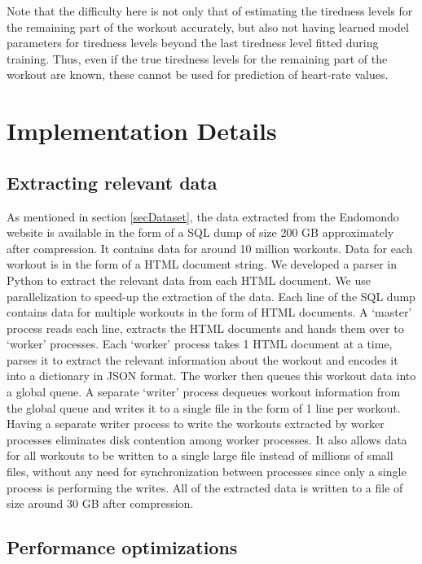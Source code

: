 \documentclass{acm_proc_article-sp}
\begin{document}
Note that the difficulty here is not only that of estimating the tiredness levels for the remaining part of the workout accurately, but also not having learned model parameters for tiredness levels beyond the last tiredness level fitted during training. Thus, even if the true tiredness levels for the remaining part of the workout are known, these cannot be used for prediction of heart-rate values.

\section{Implementation Details}
\label{secImplementationDetails}

\subsection{Extracting relevant data}
As mentioned in section \ref{secDataset}, the data extracted from the Endomondo website \cite{endomondo} is available in the form of a SQL dump of size 200 GB approximately after compression. It contains data for around 10 million workouts. Data for each workout is in the form of a HTML document string. We developed a parser in Python to extract the relevant data from each HTML document.  We use parallelization to speed-up the extraction of the data. Each line of the SQL dump contains data for multiple workouts in the form of HTML documents. A `master' process reads each line, extracts the HTML documents and hands them over to `worker' processes. Each `worker' process takes 1 HTML document at a time, parses it to extract the relevant information about the workout and encodes it into a dictionary in JSON format. The worker then queues this workout data into a global queue. A separate `writer' process dequeues workout information from the global queue and writes it to a single file in the form of 1 line per workout. Having a separate writer process to write the workouts extracted by worker processes eliminates disk contention among worker processes. It also allows data for all workouts to be written to a single large file instead of millions of small files, without any need for synchronization between processes since only a single process is performing the writes. All of the extracted data is written to a file of size around 30 GB after compression.

\subsection{Performance optimizations}
\end{document}
